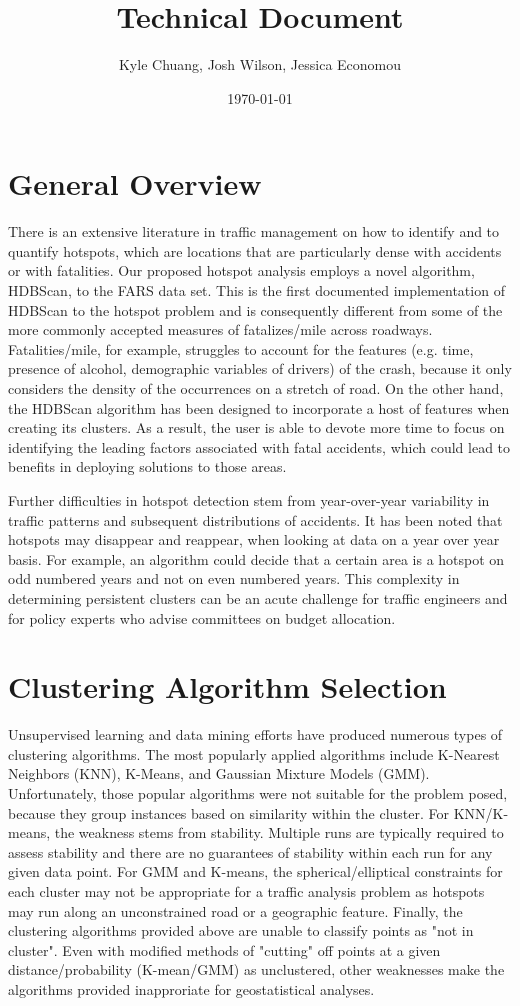 \documentclass{article}
\begin{document}
\title{Technical Document}
\date{\today}
\author{Kyle Chuang, Josh Wilson, Jessica Economou}

\section{General Overview}
 There is an extensive literature in traffic management on how to identify and to quantify hotspots, which are locations that are particularly dense with accidents or with fatalities. Our proposed hotspot analysis employs a novel algorithm, HDBScan, to the FARS data set. This is the first documented implementation of HDBScan to the hotspot problem and is consequently different from some of the more commonly accepted measures of fatalizes/mile across roadways. Fatalities/mile, for example, struggles to account for the features (e.g. time, presence of alcohol, demographic variables of drivers) of the crash, because it only considers the density of the occurrences on a stretch of road. On the other hand, the HDBScan algorithm has been designed to incorporate a host of features when creating its clusters. As a result, the user is able to devote more time to focus on identifying the leading factors associated with fatal accidents, which could lead to benefits in deploying solutions to those areas.

Further difficulties in hotspot detection stem from year-over-year variability in traffic patterns and subsequent distributions of accidents. It has been noted that hotspots may disappear and reappear, when looking at data on a year over year basis. For example, an algorithm could decide that a certain area is a hotspot on odd numbered years and not on even numbered years. This complexity in determining persistent clusters can be an acute challenge for traffic engineers and for policy experts who advise committees on budget allocation.

\section{Clustering Algorithm Selection}
Unsupervised learning and data mining efforts have produced numerous types of clustering algorithms. The most popularly applied algorithms include K-Nearest Neighbors (KNN), K-Means, and Gaussian Mixture Models (GMM). Unfortunately, those popular algorithms were not suitable for the problem posed, because they group instances based on similarity within the cluster. For KNN/K-means, the weakness stems from stability. Multiple runs are typically required to assess stability and there are no guarantees of stability within each run for any given data point. For GMM and K-means, the spherical/elliptical constraints for each cluster may not be appropriate for a traffic analysis problem as hotspots may run along an unconstrained road or a geographic feature. Finally, the clustering algorithms provided above are unable to classify points as "not in cluster". Even with modified methods of "cutting" off points at a given distance/probability (K-mean/GMM) as unclustered, other weaknesses make the algorithms provided inapproriate for geostatistical analyses.
\end{document}
